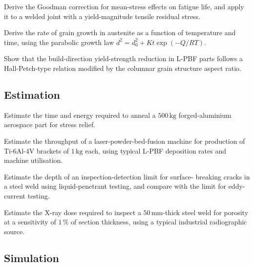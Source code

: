 \begin{exercise}
Derive the Goodman correction for mean-stress effects on fatigue
life, and apply it to a welded joint with a yield-magnitude tensile
residual stress.
\end{exercise}

\begin{exercise}
Derive the rate of grain growth in austenite as a function of
temperature and time, using the parabolic growth law $d^2 = d_0^2 +
K t \exp(-Q/RT)$.
\end{exercise}

\begin{exercise}
Show that the build-direction yield-strength reduction in L-PBF parts
follows a Hall-Petch-type relation modified by the columnar grain
structure aspect ratio.
\end{exercise}

\subsection*{Estimation}

\begin{exercise}
Estimate the time and energy required to anneal a $500\,\text{kg}$
forged-aluminium aerospace part for stress relief.
\end{exercise}

\begin{exercise}
Estimate the throughput of a laser-powder-bed-fusion machine for
production of Ti-6Al-4V brackets of $1\,\text{kg}$ each, using
typical L-PBF deposition rates and machine utilisation.
\end{exercise}

\begin{exercise}
Estimate the depth of an inspection-detection limit for surface-
breaking cracks in a steel weld using liquid-penetrant testing, and
compare with the limit for eddy-current testing.
\end{exercise}

\begin{exercise}
Estimate the X-ray dose required to inspect a $50\,\text{mm}$-thick
steel weld for porosity at a sensitivity of $1\,\%$ of section
thickness, using a typical industrial radiographic source.
\end{exercise}

\subsection*{Simulation}

